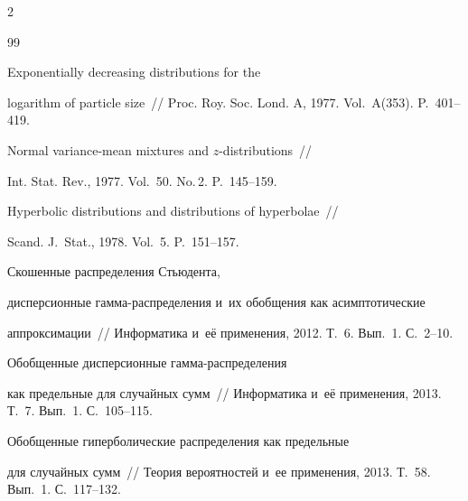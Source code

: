\begin{multicols}{2}
{{\begin{thebibliography}{99}


 Exponentially decreasing distributions for the 


logarithm of particle size~// Proc. Roy. Soc. Lond. A, 1977. Vol.~A(353). P.~401--419.












Normal variance-mean mixtures and $z$-distributions~// 


Int. Stat. Rev., 1977. Vol.~50. No.\,2. P.~145--159.







 Hyperbolic distributions and distributions of hyperbolae~// 


Scand. J.~Stat., 1978. Vol.~5. P.~151--157.










 Скошенные распределения Стьюдента,


 дисперсионные гам\-ма-рас\-пре\-де\-ле\-ния и~их обобщения как асимптотические 


 аппроксимации~// Информатика и~её применения, 2012. Т.~6. Вып.~1. С.~2--10.







 Обобщенные дисперсионные гамма-распределения 


как предельные для случайных сумм~// Информатика и~её применения, 2013. Т.~7. Вып.~1. С.~105--115.







 Обобщенные гиперболические распределения как предельные 


для случайных сумм~// Теория вероятностей и~ее применения, 2013. Т.~58. Вып.~1. С.~117--132.






\end{thebibliography}}}
\end{multicols}
